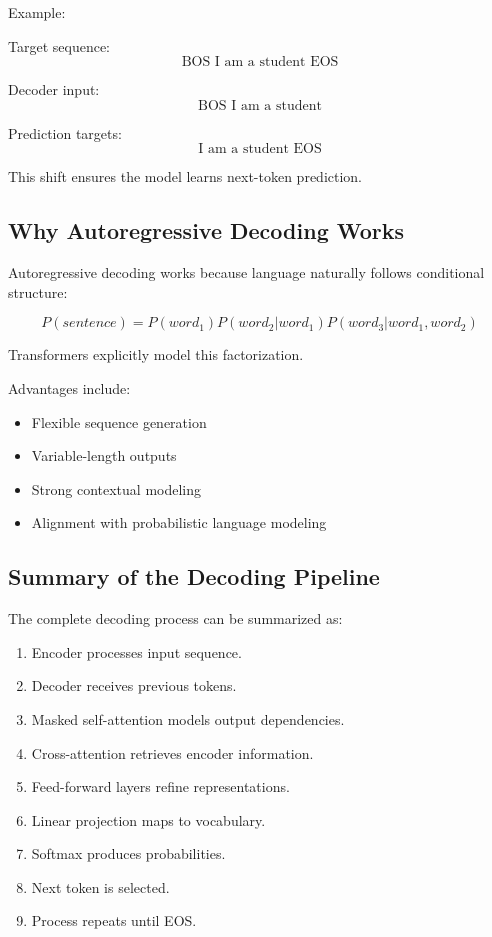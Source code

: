 \documentclass[11pt]{article}
\begin{document}
Example:

Target sequence:
\[
\text{BOS I am a student EOS}
\]

Decoder input:
\[
\text{BOS I am a student}
\]

Prediction targets:
\[
\text{I am a student EOS}
\]

This shift ensures the model learns next-token prediction.

\subsection{Why Autoregressive Decoding Works}

Autoregressive decoding works because language naturally follows conditional structure:

\[
P(sentence)
=
P(word_1)
P(word_2|word_1)
P(word_3|word_1,word_2)
\]

Transformers explicitly model this factorization.

Advantages include:

\begin{itemize}

\item Flexible sequence generation
\item Variable-length outputs
\item Strong contextual modeling
\item Alignment with probabilistic language modeling

\end{itemize}

\subsection{Summary of the Decoding Pipeline}

The complete decoding process can be summarized as:

\begin{enumerate}

\item Encoder processes input sequence.
\item Decoder receives previous tokens.
\item Masked self-attention models output dependencies.
\item Cross-attention retrieves encoder information.
\item Feed-forward layers refine representations.
\item Linear projection maps to vocabulary.
\item Softmax produces probabilities.
\item Next token is selected.
\item Process repeats until EOS.

\end{enumerate}
\end{document}
